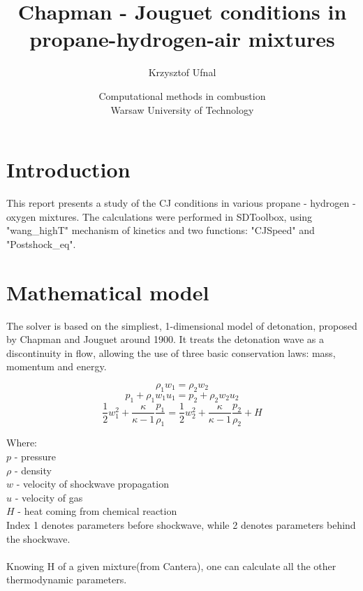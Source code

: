 \documentclass[11pt,a4paper]{article}
\title{Chapman - Jouguet conditions in propane-hydrogen-air mixtures}
\author{Krzysztof Ufnal}
\date{Computational methods in combustion\\
Warsaw University of Technology}
\begin{document}
\maketitle

\clearpage
\tableofcontents
\clearpage
\section{Introduction}\label{sec:intro}
This report presents a study of the CJ conditions in various propane - hydrogen - oxygen mixtures. The calculations were performed in SDToolbox, using "wang\_highT" mechanism of kinetics and two functions: "CJSpeed" and "Postshock\_eq".

\section{Mathematical model}\label{sec:model}
The solver is based on the simpliest, 1-dimensional model of detonation, proposed by Chapman and Jouguet around 1900. It treats the detonation wave as a discontinuity in flow, allowing the use of three basic conservation laws: mass, momentum and energy.

\begin{equation}
    \rho_1 w_1 = \rho_2 w_2
\end{equation}
\begin{equation}
    p_1 + \rho_1 w_1 u_1 =p_2 + \rho_2 w_2 u_2
\end{equation}
\begin{equation}
    \frac{1}{2} w_1^2 + \frac{\kappa}{\kappa - 1} \frac{p_1}{\rho_1} = \frac{1}{2} w_2^2 + \frac{\kappa}{\kappa - 1} \frac{p_2}{\rho_2} + H
\end{equation}

Where:\\
$p$ - pressure\\
$\rho$ - density\\
$w$ - velocity of shockwave propagation\\
$u$ - velocity of gas\\
$H$ - heat coming from chemical reaction\\
Index 1 denotes parameters before shockwave, while 2 denotes parameters behind the shockwave.
\\
\\
Knowing H of a given mixture(from Cantera), one can calculate all the other thermodynamic parameters. 
\end{document}
